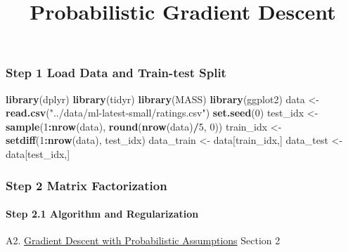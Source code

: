 \documentclass[]{article}
\title{Probabilistic Gradient Descent}
\author{}
\date{}
\newenvironment{Shaded}{\begin{snugshade}}{\end{snugshade}}
\newcommand{\DecValTok}[1]{\textcolor[rgb]{0.00,0.00,0.81}{#1}}
\newcommand{\KeywordTok}[1]{\textcolor[rgb]{0.13,0.29,0.53}{\textbf{#1}}}
\newcommand{\NormalTok}[1]{#1}
\newcommand{\OperatorTok}[1]{\textcolor[rgb]{0.81,0.36,0.00}{\textbf{#1}}}
\newcommand{\StringTok}[1]{\textcolor[rgb]{0.31,0.60,0.02}{#1}}
\let\oldparagraph\paragraph
\renewcommand{\paragraph}[1]{\oldparagraph{#1}\mbox{}}
\begin{document}
\maketitle

\hypertarget{step-1-load-data-and-train-test-split}{%
\subsubsection{Step 1 Load Data and Train-test
Split}\label{step-1-load-data-and-train-test-split}}

\begin{Shaded}
\begin{Highlighting}[]
\KeywordTok{library}\NormalTok{(dplyr)}
\KeywordTok{library}\NormalTok{(tidyr)}
\KeywordTok{library}\NormalTok{(MASS)}
\KeywordTok{library}\NormalTok{(ggplot2)}
\NormalTok{data <-}\StringTok{ }\KeywordTok{read.csv}\NormalTok{(}\StringTok{"../data/ml-latest-small/ratings.csv"}\NormalTok{)}
\KeywordTok{set.seed}\NormalTok{(}\DecValTok{0}\NormalTok{)}
\NormalTok{test_idx <-}\StringTok{ }\KeywordTok{sample}\NormalTok{(}\DecValTok{1}\OperatorTok{:}\KeywordTok{nrow}\NormalTok{(data), }\KeywordTok{round}\NormalTok{(}\KeywordTok{nrow}\NormalTok{(data)}\OperatorTok{/}\DecValTok{5}\NormalTok{, }\DecValTok{0}\NormalTok{))}
\NormalTok{train_idx <-}\StringTok{ }\KeywordTok{setdiff}\NormalTok{(}\DecValTok{1}\OperatorTok{:}\KeywordTok{nrow}\NormalTok{(data), test_idx)}
\NormalTok{data_train <-}\StringTok{ }\NormalTok{data[train_idx,]}
\NormalTok{data_test <-}\StringTok{ }\NormalTok{data[test_idx,]}
\end{Highlighting}
\end{Shaded}

\hypertarget{step-2-matrix-factorization}{%
\subsubsection{Step 2 Matrix
Factorization}\label{step-2-matrix-factorization}}

\hypertarget{step-2.1-algorithm-and-regularization}{%
\paragraph{Step 2.1 Algorithm and
Regularization}\label{step-2.1-algorithm-and-regularization}}

A2. \href{./paper/P3\%20probabilistic-matrix-factorization.pdf}{Gradient
Descent with Probabilistic Assumptions} Section 2
\end{document}
